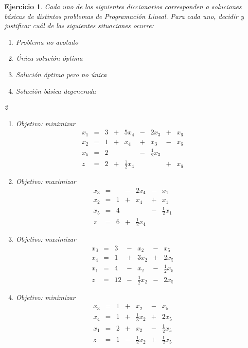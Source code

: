 \documentclass[a4paper,oneside,12pt]{amsart}
\newtheorem{quest}{Ejercicio}
\begin{document}

\begin{quest} 
Cada uno de los siguientes diccionarios corresponden a soluciones básicas de distintos problemas de Programación Lineal. Para cada uno, decidir y justificar cuál de las siguientes situaciones ocurre:
\begin{enumerate}[label=\alph*)]
    \item Problema no acotado
    \item Única solución óptima
    \item Solución óptima pero no única
    \item Solución básica degenerada
\end{enumerate}

\begin{multicols}{2}
\begin{enumerate}[label=\Roman*)]
    \item Objetivo: minimizar
    \[\begin{array}{rrrrrrrrr}
                x_1 & = & 3 & + & 5x_4 & - & 2x_3 & + & x_6 \\
                x_2&=& 1&+&x_4&+&x_3&-&x_6\\ 
                x_5&=&2&&&-&\frac{1}{2}x_3&&\\ \hline
                z&=&2&+&\frac{1}{2}x_4&&&+& x_6
    \end{array}\]
    \item Objetivo: maximizar 
    \[\begin{array}{rrrrrrr}
                x_3 & = &  & - & 2x_4 & - & x_1\\
                x_2&=& 1&+&x_4&+&x_1\\ 
                x_5&=&4&&&-&\frac{1}{2}x_1\\ \hline
                z&=&6&+&\frac{1}{2}x_4&&
    \end{array}\]
    
    \item Objetivo: maximizar
    \[\begin{array}{rrrrrrr}
                x_3 & = & 3 & - & x_2 & - & x_5\\
                x_4&=& 1&+&3x_2&+&2x_5\\ 
                x_1&=&4&-&x_2&-&\frac{1}{2}x_5\\ \hline
                z&=&12&-&\frac{1}{2}x_2&-&2x_5
    \end{array}\]
    \item Objetivo: minimizar
    \[\begin{array}{rrrrrrr}
                x_3 & = & 1 & + & x_2 & - & x_5\\
                x_4&=& 1&+&\frac{1}{3}x_2&+&2x_5\\ 
                x_1&=&2&+&x_2&-&\frac{1}{2}x_5\\ \hline
                z&=&1&-&\frac{1}{2}x_2&+&\frac{1}{2}x_5
    \end{array}\]
    
\end{enumerate}
\end{multicols}
\end{quest}
\end{document}
